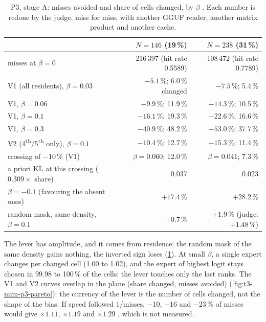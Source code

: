 \begin{table}[tbp]
\centering\small
\caption[P3, stage A: misses avoided and cells changed]{P3, stage A: misses avoided and share of cells changed, by $\beta$ \mes. Each number is redone by the judge, miss for miss, with another GGUF reader, another matrix product and another cache.}
\label{t3mim:tab:p3-A}
\begin{tabular}{@{}lrr@{}}
\toprule
& $N = 146$ (19\,\%) & $N = 238$ (31\,\%) \\
\midrule
misses at $\beta = 0$ & 216\,397 (hit rate 0.5589) & 108\,472 (hit rate 0.7789) \\
V1 (all residents), $\beta = 0.03$ & $-5.1\,\%$; 6.0\,\% changed & $-7.5\,\%$; 5.4\,\% \\
V1, $\beta = 0.06$ & $-9.9\,\%$; 11.9\,\% & $-14.3\,\%$; 10.5\,\% \\
V1, $\beta = 0.1$ & $\mathbf{-16.1\,\%}$; 19.3\,\% & $\mathbf{-22.6\,\%}$; 16.6\,\% \\
V1, $\beta = 0.3$ & $-40.9\,\%$; 48.2\,\% & $-53.0\,\%$; 37.7\,\% \\
V2 (4\textsuperscript{th}/5\textsuperscript{th} only), $\beta = 0.1$ & $-10.4\,\%$; 12.7\,\% & $-15.3\,\%$; 11.4\,\% \\
crossing of $-10\,\%$ (V1) & $\beta = 0.060$; 12.0\,\% & $\beta = 0.041$; 7.3\,\% \\
a priori KL at this crossing ($0.309 \times$ share) & 0.037 & 0.023 \\
$\beta = -0.1$ (favouring the absent ones) & $+17.4\,\%$ & $+28.2\,\%$ \\
random mask, same density, $\beta = 0.1$ & $+0.7\,\%$ & $+1.9\,\%$ (judge: $+1.48\,\%$) \\
\bottomrule
\end{tabular}
\end{table}

The lever has amplitude, and it comes from residence: the random mask of the same density gains nothing, the inverted sign loses (\cref{t3mim:tab:p3-A}). At small $\beta$, a single expert changes per changed cell (1.00 to 1.02), and the expert of highest logit stays chosen in 99.98 to 100\,\% of the cells: the lever touches only the last ranks. The V1 and V2 curves overlap in the plane (share changed, misses avoided) (\cref{fig:t3-mim-p3-pareto}): the currency of the lever is the number of cells changed, not the shape of the bias. If speed followed $1/\text{misses}$, $-10$, $-16$ and $-23\,\%$ of misses would give $\times 1.11$, $\times 1.19$ and $\times 1.29$ \calc, which is not measured.

